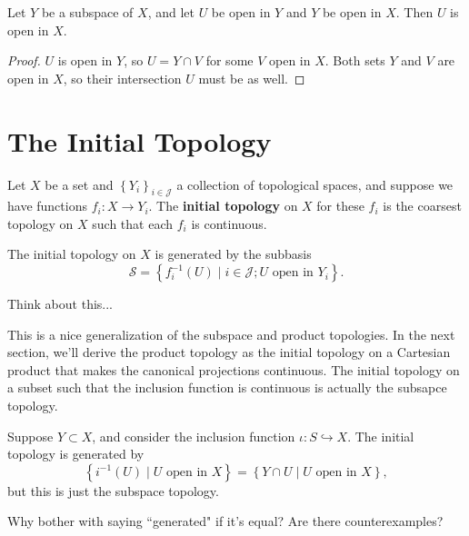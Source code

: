 \documentclass[twoside,10pt]{report}
\begin{document}
\begin{prop}
	Let $Y$ be a subspace of $X$, and let $U$ be open in $Y$ and $Y$ be open in $X$. Then $U$ is open in $X$.
\end{prop}
\begin{proof}
	$U$ is open in $Y$, so $U=Y \cap V$ for some $V$ open in $X$. Both sets $Y$ and $V$ are open in $X$, so their intersection $U$ must be as well.
\end{proof}


\newpage

\section{The Initial Topology}

\begin{defn}[]
Let $X$ be a set and $\left\{ Y_i \right\}_{i \in \mathcal{J}}$ a collection of topological spaces, and suppose we have functions $f_i: X\to Y_i$. The \textbf{initial topology} on $X$ for these $f_i$ is the coarsest topology on $X$ such that each $f_i$ is continuous.
\end{defn}

\begin{prop}
The initial topology on $X$ is generated by the subbasis
\[
	\mathcal{S} = \left\{ f_i^{-1}(U) \;|\; i \in \mathcal{J}; U \text{ open in } Y_i \right\}.
\]
\end{prop}
{\color{red}Think about this...}

This is a nice generalization of the subspace and product topologies. In the next section, we'll derive the product topology as the initial topology on a Cartesian product that makes the canonical projections continuous. The initial topology on a subset such that the inclusion function is continuous is actually the subsapce topology.

\begin{ex}[]
	Suppose $Y \subset X$, and consider the inclusion function $\iota:S \hookrightarrow X$. The initial topology is generated by
	\[
		\left\{ i^{-1}(U) \;|\; U \text{ open in } X \right\} = \left\{ Y \cap U \;|\; U \text{ open in } X \right\},
	\] but this is just the subspace topology.

	{\color{red}Why bother with saying ``generated" if it's equal? Are there counterexamples?}
\end{ex}


\end{document}
